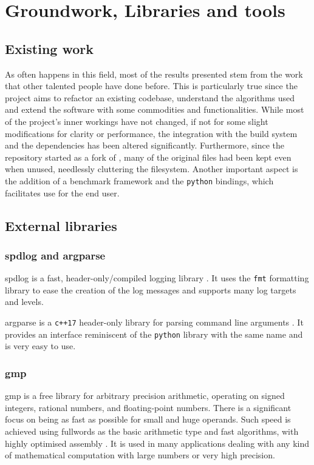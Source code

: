 \chapter{Groundwork, Libraries and tools}

\section{Existing work}

As often happens in this field, most of the results presented stem from the work that other talented people have done before.
This is particularly true since the project aims to refactor an existing codebase, understand the algorithms used and extend the software with some commodities and functionalities.
While most of the project's inner workings have not changed, if not for some slight modifications for clarity or performance, the integration with the build system and the dependencies has been altered significantly.
Furthermore, since the repository started as a fork of \dreal \cite{repo:dreal}, many of the original files had been kept even when unused, needlessly cluttering the filesystem.
Another important aspect is the addition of a benchmark framework and the \texttt{python} bindings, which facilitates use for the end user.

\section{External libraries}

\subsection*{spdlog and argparse}

spdlog is a fast, header-only/compiled logging library \cite{repo:spdlog}.
It uses the \texttt{fmt} formatting library to ease the creation of the log messages and supports many log targets and levels.

argparse is a \texttt{c++17} header-only library for parsing command line arguments \cite{repo:argparse}.
It provides an interface reminiscent of the \texttt{python} library with the same name and is very easy to use.

\subsection*{gmp}

gmp is a free library for arbitrary precision arithmetic, operating on signed integers, rational numbers, and floating-point numbers.
There is a significant focus on being as fast as possible for small and huge operands.
Such speed is achieved using fullwords as the basic arithmetic type and fast algorithms, with highly optimised assembly \cite{man:gmp}.
It is used in many applications dealing with any kind of mathematical computation with large numbers or very high precision.

